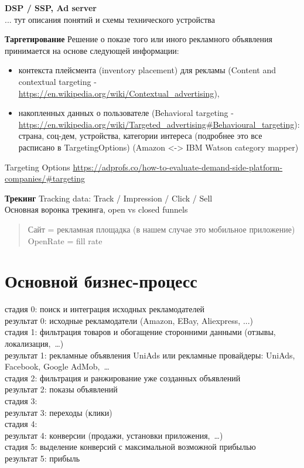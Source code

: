 \documentclass[times]{itmo-student-thesis}
\begin{document}

\textbf{DSP / SSP, Ad server}
\\
... тут описания понятий и схемы технического устройства


\textbf{Таргетирование}
Решение о показе того или иного рекламного объявления принимается на основе следующей информации:
\begin{itemize}
	\item контекста плейсмента (inventory placement) для рекламы (Content and contextual targeting - \url{https://en.wikipedia.org/wiki/Contextual_advertising}),
	\item накопленных данных о пользователе (Behavioral targeting - \url{https://en.wikipedia.org/wiki/Targeted_advertising#Behavioural_targeting}): страна, соц-дем, устройства, категории интереса (подробнее это все расписано в TargetingOptions) (Amazon <-> IBM Watson category mapper)
\end{itemize}
\bigbreak

Targeting Options \url{https://adprofs.co/how-to-evaluate-demand-side-platform-companies/#targeting}


\textbf{Трекинг}
Tracking data: Track / Impression / Click / Sell
\\
Основная воронка трекинга, open vs closed funnels


\begin{quotation}
  Сайт = рекламная площадка (в нашем случае это мобильное приложение)
  \\
  OpenRate = fill rate

\end{quotation}


\section{Основной бизнес-процесс}

стадия 0: поиск и интеграция исходных рекламодателей
\\
результат 0: исходные рекламодатели (Amazon, EBay, Aliexpress, ...)
\\
стадия 1: фильтрация товаров и обогащение сторонними данными (отзывы, локализация, …)
\\
результат 1: рекламные объявления UniAds или рекламные провайдеры: UniAds, Facebook, Google AdMob, …
\\
стадия 2: фильтрация и ранжирование уже созданных объявлений
\\
результат 2: показы объявлений
\\
стадия 3:
\\
результат 3: переходы (клики)
\\
стадия 4:
\\
результат 4: конверсии (продажи, установки приложения, …)
\\
стадия 5: выделение конверсий с максимальной возможной прибылью
\\
результат 5: прибыль
\\	
\end{document}
